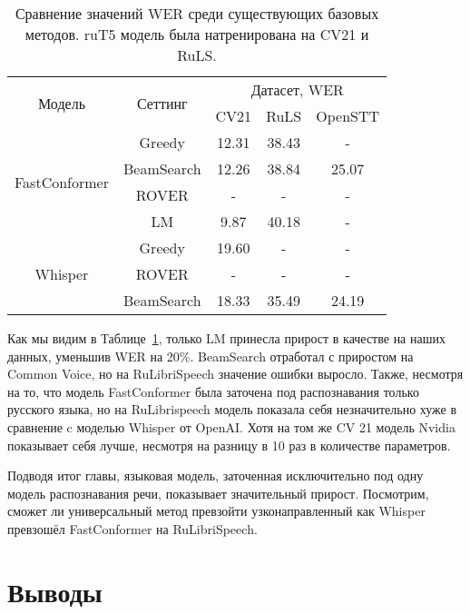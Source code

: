 \begin{table}[]
\centering
\caption{Сравнение значений WER среди существующих базовых методов. ruT5 модель была натренирована на CV21 и RuLS.}
\begin{tabular}{|c|c|ccc|}
\hline
\multirow{2}{*}{Модель}        & \multirow{2}{*}{Сеттинг}             & \multicolumn{3}{c|}{Датасет, WER}                                    \\ \cline{3-5} 
                               &                                      & \multicolumn{1}{c|}{CV21}  & \multicolumn{1}{c|}{RuLS}     & OpenSTT \\ \hline
\multirow{4}{*}{FastConformer} & Greedy                               & \multicolumn{1}{c|}{12.31} & \multicolumn{1}{c|}{38.43}    & -       \\ \cline{2-5} 
                               & BeamSearch                           & \multicolumn{1}{c|}{12.26} & \multicolumn{1}{c|}{38.84}    & 25.07   \\ \cline{2-5}
                               & ROVER                                & \multicolumn{1}{c|}{-} & \multicolumn{1}{c|}{-}    & -       \\ \cline{2-5}
                               & LM                                   & \multicolumn{1}{c|}{9.87}  & \multicolumn{1}{c|}{40.18}    & -       \\ \hline 
\multirow{3}{*}{Whisper}       & Greedy                               & \multicolumn{1}{c|}{19.60} & \multicolumn{1}{c|}{-}    & -       \\ \cline{2-5} 
                               & ROVER                                & \multicolumn{1}{c|}{-} & \multicolumn{1}{c|}{-}    & -       \\ \cline{2-5}
                               & BeamSearch                           & \multicolumn{1}{c|}{18.33} & \multicolumn{1}{c|}{35.49}    & 24.19   \\ \hline
                               
\end{tabular}
\label{tab:res_comp}
\end{table}

Как мы видим в Таблице~\ref{tab:res_comp}, только LM принесла прирост в качестве на наших данных, уменьшив WER на 20\%.
BeamSearch отработал с приростом на Common Voice, но на RuLibriSpeech значение ошибки выросло.
Также, несмотря на то, что модель FastConformer была заточена под распознавания только русского языка, но на RuLibrispeech модель показала себя незначительно хуже в сравнение c моделью Whisper от OpenAI.
Хотя на том же CV 21 модель Nvidia показывает себя лучше, несмотря на разницу в 10 раз в количестве параметров.

Подводя итог главы, языковая модель, заточенная исключительно под одну модель распознавания речи, показывает значительный прирост.
Посмотрим, сможет ли универсальный метод превзойти узконаправленный как Whisper превзошёл FastConformer на RuLibriSpeech.

\section{Выводы}